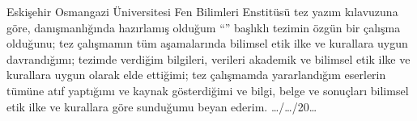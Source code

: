 \vspace{3cm}
Eskişehir Osmangazi Üniversitesi Fen Bilimleri Enstitüsü tez yazım kılavuzuna göre, \danisman danışmanlığında hazırlamış olduğum “\textbf{\tbaslik}” başlıklı tezimin özgün bir çalışma olduğunu; tez çalışmamın tüm aşamalarında bilimsel etik ilke ve kurallara uygun davrandığımı; tezimde verdiğim bilgileri, verileri akademik ve bilimsel etik ilke ve kurallara uygun olarak elde ettiğimi; tez çalışmamda yararlandığım eserlerin tümüne atıf yaptığımı ve kaynak gösterdiğimi ve bilgi, belge ve sonuçları bilimsel etik ilke ve kurallara göre sunduğumu beyan ederim.   …/…/20…
\vspace{3cm}

\begin{flushright}
\yazar
\end{flushright}